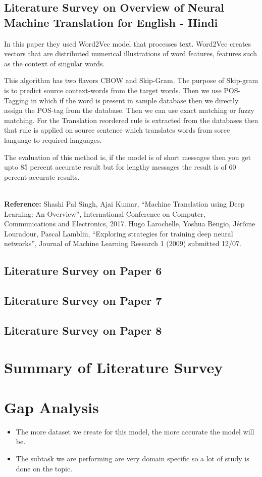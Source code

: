 \subsection{Literature Survey on Overview of Neural Machine Translation for English - Hindi}
{\normalsize{\par In this paper they used Word2Vec model that processes text. Word2Vec creates vectors that are distributed numerical illustrations of word features, features such as the context of singular words.\par This algorithm has two flavors CBOW and Skip-Gram. The purpose of Skip-gram is to predict source context-words from the target words. Then we use POS-Tagging in which if the word is present in sample database then we directly assign the POS-tag from the database. Then we can use exact matching or fuzzy matching. For the Translation reordered rule is extracted from the databases then that rule is applied on source sentence which translates words from sorce language to required languages.\par The evaluation of this method is, if the model is of short messages then you get upto 85 percent accurate result but for lengthy messages the result is of 60 percent accurate results.}} \\
{\textbf{Reference:}  Shashi Pal Singh, Ajai Kumar, “Machine Translation using Deep Learning: An Overview”, International Conference on Computer, Communications and Electronics, 2017.  Hugo Larochelle, Yoshua Bengio, Jérôme Louradour, Pascal Lamblin, “Exploring strategies for training deep neural networks”, Journal of Machine Learning Research 1 (2009) submitted 12/07.
}
\clearpage
\subsection{Literature Survey on Paper 6}
\subsection{Literature Survey on Paper 7}
\subsection{Literature Survey on Paper 8}

\section{Summary of Literature Survey}
\section{Gap Analysis}
\begin{itemize}
    \item The more dataset we create for this model, the more accurate the model will be.
    \item The subtask we are performing are very domain specific so a lot of study is done on the topic.
\end{itemize}